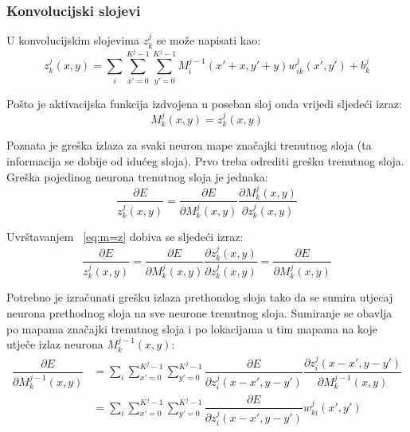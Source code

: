 \documentclass[times, utf8, zavrsni, numeric]{fer}
\begin{document}
\subsubsection{Konvolucijski slojevi}
U konvolucijskim slojevima $z_k^j$ se može napisati kao:
\begin{equation}
z^j_k (x, y) = \sum_i \sum_{x'=0}^{K^j-1} \sum_{y'=0}^{K^j-1} M^{j-1}_i (x' + x, y' + y) w^j_{ik} (x', y') + b^j_k
\end{equation}

Pošto je aktivacijska funkcija izdvojena u poseban sloj onda vrijedi sljedeći izraz:
\begin{equation}\label{eq:m=z}
M^j_k (x, y) = z^j_k (x, y)
\end{equation}

Poznata je greška izlaza za svaki neuron mape značajki trenutnog sloja (ta informacija se dobije od idućeg sloja). Prvo treba odrediti grešku trenutnog sloja. Greška pojedinog neurona trenutnog sloja je jednaka: 
\begin{equation}
\dfrac{\partial E}{z^j_k (x, y)} = \dfrac{\partial E}{\partial M^j_k (x, y)} \dfrac{\partial M^j_k (x, y)}{\partial z^j_k (x, y)}
\end{equation}

Uvrštavanjem ~\ref{eq:m=z} dobiva se sljedeći izraz:
\begin{equation}
\dfrac{\partial E}{z^j_k (x, y)} = \dfrac{\partial E}{\partial M^j_k (x, y)} \dfrac{\partial z^j_k (x, y)}{\partial z^j_k (x, y)} = \dfrac{\partial E}{\partial M^j_k (x, y)}
\end{equation}

Potrebno je izračunati  grešku izlaza prethondog sloja tako da se sumira utjecaj neurona prethodnog sloja na sve neurone trenutnog sloja. Sumiranje se obavlja po mapama značajki trenutnog sloja i po lokacijama u tim mapama na koje utječe izlaz neurona $M^{j-1}_k (x, y)$:
\begin{equation}\label{eq:conv-sloj-err}
\begin{split}
\dfrac{\partial E}{\partial M^{j-1}_k (x, y)} &= \sum_i \sum_{x'=0}^{K^j-1} \sum_{y'=0}^{K^j-1} \dfrac{\partial E}{\partial z^j_{i} (x - x',y - y')} \dfrac{\partial z^j_{i} (x - x',y - y')}{\partial M^{j-1}_k (x, y)} \\
 &= \sum_i \sum_{x'=0}^{K^j-1} \sum_{y'=0}^{K^j-1} \dfrac{\partial E}{\partial z^j_{i} (x - x', y - y')} w^j_{ki}(x', y')
\end{split}
\end{equation}
\end{document}
